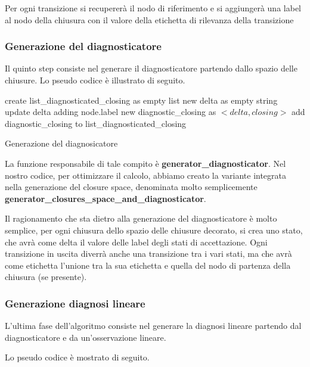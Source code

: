 Per ogni transizione si recupererà il nodo di riferimento e si aggiungerà una label al nodo della chiusura con il valore della etichetta di rilevanza della transizione

\subsubsection{Generazione del diagnosticatore}
Il quinto step consiste nel generare il diagnosticatore partendo dallo spazio delle chiusure. Lo pseudo codice è illustrato di seguito.

\begin{algorithm}[H]
\SetAlgoLined
{}
create list\_diagnosticated\_closing as empty list\;
{
    new delta as empty string\;
    {
        update delta adding node.label\;
    }
    new diagnostic\_closing as $<delta, closing>$\;
    add diagnostic\_closing to list\_diagnosticated\_closing\;
}
     \caption{Generazione del diagnosicatore}
\end{algorithm}

La funzione responsabile di tale compito è \textbf{generator\_diagnosticator}. Nel nostro codice, per ottimizzare il calcolo, abbiamo creato la variante integrata nella generazione del closure space, denominata molto semplicemente \textbf{generator\_closures\_space\_and\_diagnosticator}.

Il ragionamento che sta dietro alla generazione del diagnosticatore è molto semplice, per ogni chiusura dello spazio delle chiusure decorato, si crea uno stato, che avrà come delta il valore delle label degli stati di accettazione. Ogni transizione in uscita diverrà anche una transizione tra i vari stati, ma che avrà come etichetta l’unione tra la sua etichetta e quella del nodo di partenza della chiusura (se presente).

\subsubsection{Generazione diagnosi lineare}
L’ultima fase dell’algoritmo consiste nel generare la diagnosi lineare partendo dal diagnosticatore e da un’osservazione lineare.

Lo pseudo codice è mostrato di seguito.

